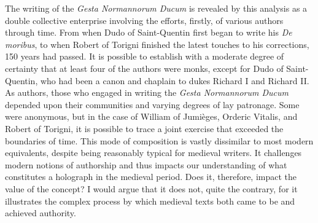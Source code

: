 \documentclass{article}
\begin{document}
The writing of the \emph{Gesta Normannorum Ducum} is revealed by this
analysis as a double collective enterprise involving the efforts,
firstly, of various authors through time. From when Dudo of
Saint-Quentin first began to write his \emph{De moribus}, to when Robert
of Torigni finished the latest touches to his corrections, 150 years had
passed. It is possible to establish with a moderate degree of certainty
that at least four of the authors were monks, except for Dudo of
Saint-Quentin, who had been a canon and chaplain to dukes Richard I and
Richard II. As authors, those who engaged in writing the \emph{Gesta
Normannorum Ducum} depended upon their communities and varying degrees
of lay patronage. Some were anonymous, but in the case of William of
Jumièges, Orderic Vitalis, and Robert of Torigni, it is possible to trace
a joint exercise that exceeded the boundaries of time. This mode of
composition is vastly dissimilar to most modern equivalents, despite
being reasonably typical for medieval writers. It challenges modern
notions of authorship and thus impacts our understanding of what
constitutes a holograph in the medieval period. Does it, therefore,
impact the value of the concept? I would argue that it does not, quite
the contrary, for it illustrates the complex process by which medieval
texts both came to be and achieved authority.
\end{document}
